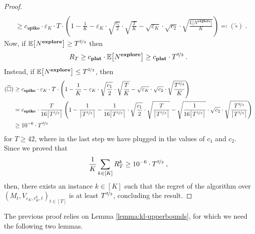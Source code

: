 \documentclass[final,12pt]{colt2025}
\newcommand{\E}{\mathbb{E}}
\newcommand{\e}{\varepsilon}
\newcommand{\lrb}[1]{\left(#1\right)}
\newcommand{\bsb}[1]{\bigl[#1\bigr]}
\newcommand{\nP}{M}
\newcommand{\nZ}{V}
\newcommand{\nc}{c}
\renewcommand{\tilde}{\widetilde}
\begin{document}
{\begin{proof}
\begin{align*}
\\
&\ge
    c_{\textbf{spike}} \cdot \e_K \cdot T \cdot \lrb{ 1 - \frac{1}{K} -  \e_K \cdot \sqrt{\frac{\nc_1}{2}} \cdot \sqrt{\frac{T}{K}} -  \sqrt{\e_K} \cdot \sqrt{ c_2} \cdot \sqrt{ \frac{\E\bsb{N^{\textbf{explore}}}}{K}}}
\eqqcolon
    (\tilde{\square})\;.
\end{align*}
Now, if $\E\bsb{N^{\textbf{explore}}} \ge T^{\nicefrac{2}{3}}$ then
\[
    R_T \ge c_{\textbf{plat}} \cdot \E\bsb{N^{\textbf{explore}}} \ge c_{\textbf{plat}} \cdot T^{\nicefrac{2}{3}}\;.
\]
Instead, if $\E\bsb{N^{\textbf{explore}}}\le T^{\nicefrac{2}{3}}$, then
\begin{align*}
    (\tilde{\square})
&\ge
    c_{\textbf{spike}} \cdot \e_K \cdot T \cdot \lrb{ 1 - \frac{1}{K} -  \e_K \cdot \sqrt{\frac{\nc_1}{2}} \cdot \sqrt{\frac{T}{K}} - \sqrt{\e_K} \cdot \sqrt{ c_2} \cdot \sqrt{ \frac{T^{\nicefrac{2}{3}}}{K}}}
\\
&=
    c_{\textbf{spike}} \cdot \frac{T}{16 \bigl\lceil T^{\nicefrac{1}{3}} \bigr\rceil } 
    \lrb{ 1 - \frac{1}{\bigl\lceil T^{\nicefrac{1}{3}} \bigr\rceil } -  \frac{1}{16 \bigl\lceil T^{\nicefrac{1}{3}} \bigr\rceil } \cdot \sqrt{\frac{\nc_1}{2}} \cdot \sqrt{\frac{T}{\bigl\lceil T^{\nicefrac{1}{3}} \bigr\rceil }} - \sqrt{\frac{1}{16 \bigl\lceil T^{\nicefrac{1}{3}} \bigr\rceil }} \cdot \sqrt{ c_2} \cdot \sqrt{ \frac{T^{\nicefrac{2}{3}}}{\bigl\lceil T^{\nicefrac{1}{3}} \bigr\rceil }}}
\\
&\ge
    10^{-6}\cdot T^{\nicefrac{2}{3}}\;
\end{align*}
for $T\ge 42$, where in the last step we have plugged in the values of $c_1$ and $c_2$.
Since we proved that
\[
    \frac{1}{K} \sum_{k \in [K]} R^k_T \ge 10^{-6}\cdot T^{\nicefrac{2}{3}} \;,
\]
then, there exists an instance $k\in[K]$ such that the regret of the algorithm over $(\nP_t,\nZ_{\e_K,r_K^k,t})_{t \in [T]}$ is at least $T^{\nicefrac{2}{3}}$, concluding the result.
\end{proof}
}







The previous proof relies on Lemma \ref{lemma:kl-upperbounds}, for which we need the following two lemmas.
\end{document}
